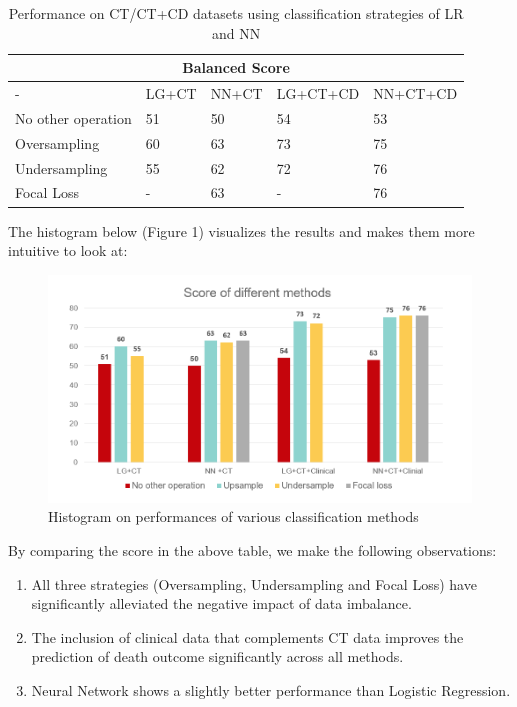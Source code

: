 \documentclass{article}
\begin{document}
\begin{table}[!htb]
    \centering
\begin{tabular}{ |p{3cm}||p{2cm}|p{2cm}|p{2cm}|p{2cm} | }
 \hline
 \multicolumn{5}{|c|}{Balanced Score} \\
 \hline
      -              & LG+CT    & NN+CT &  LG+CT+CD & NN+CT+CD \\
\hline
 No other operation   & 51    & 50 & 54 &  53 \\\hline
 Oversampling    & 60    & 63 &  73 & 75 \\\hline
 Undersampling   & 55   & 62 &  72 & 76 \\\hline
 Focal Loss   & -    & 63 &  - & 76 \\
 \hline
\end{tabular}
    \caption{Performance on CT/CT+CD datasets using classification strategies of LR and NN}
    \label{tab:bs}
\end{table}

The histogram below (Figure 1) visualizes the results and makes them more intuitive to look at:

\begin{figure}[h]
\begin{center}
    \includegraphics{plot/Balanced Score.png}
    \caption{Histogram on performances of various classification methods}
\end{center}
\end{figure}

By comparing the score in the above table, we make the following observations:

\begin{enumerate}
    \item All three strategies (Oversampling, Undersampling and Focal Loss) have significantly alleviated the negative impact of data imbalance. 
    \item The inclusion of clinical data that complements CT data improves the prediction of death outcome significantly across all methods.
    \item Neural Network shows a slightly better performance than Logistic Regression. 
\end{enumerate}
\end{document}
